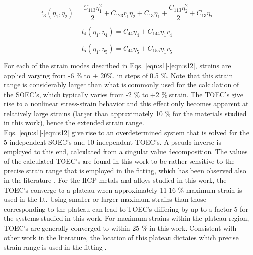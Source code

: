 \documentclass[showpacs,aps,floatfix,prb,reprint,superscriptaddress]{revtex4-1}
\begin{document}
\begin{equation}
\label{eqn:s10} 
t_{3} \left(\eta_{1}, \eta_{2}\right) = \frac{C_{113}\eta_{1}^2}{2} + C_{123}\eta_{1}\eta_{2} + C_{13}\eta_{1} +  \frac{C_{113}\eta_{2}^2}{2} + C_{13}\eta_{2}
\end{equation}


\begin{equation}
\label{eqn:s11} 
t_{4} \left(\eta_{1}, \eta_{4}\right) = C_{44}\eta_{4} + C_{144}\eta_{1}\eta_{4}
\end{equation}

\begin{equation}
\label{eqn:s12} 
t_{5} \left(\eta_{1}, \eta_{5}\right) = C_{44}\eta_{5} + C_{155}\eta_{1}\eta_{5}
\end{equation}

For each of the strain modes described in Eqs. \ref{eqn:s1}-\ref{eqn:s12}, strains are applied varying from -6 \% to + 20\%, in steps of 0.5 \%. Note that this strain range is considerably larger than what is commonly used for the calculation of the SOEC's, which typically varies from -2 \% to +2 \% strain. The TOEC's give rise to a nonlinear stress-strain behavior and this effect only becomes apparent at relatively large strains (larger than approximately 10 \% for the materials studied in this work), hence the extended strain range. \\

Eqs. \ref{eqn:s1}-\ref{eqn:s12} give rise to an overdetermined system that is solved for the 5 independent SOEC's and 10 independent TOEC's. A pseudo-inverse is employed to this end, calculated from a singular value decomposition. The values of the calculated TOEC's are found in this work to be rather sensitive to the precise strain range that is employed in the fitting, which has been observed also in the literature \cite{wang2009ab,lopuszynski2007ab,wang2012nonlinear}. For the HCP-metals and alloys studied in this work, the TOEC's converge to a plateau when approximately 11-16 \% maximum strain is used in the fit. Using smaller or larger maximum strains than those corresponding to the plateau can lead to TOEC's differing by up to a factor 5 for the systems studied in this work. For maximum strains within the plateau-region, TOEC's are generally converged to within 25 \% in this work. Consistent with other work in the literature, the location of this plateau dictates which precise strain range is used in the fitting \cite{wang2009ab,wang2012nonlinear}.
\end{document}
